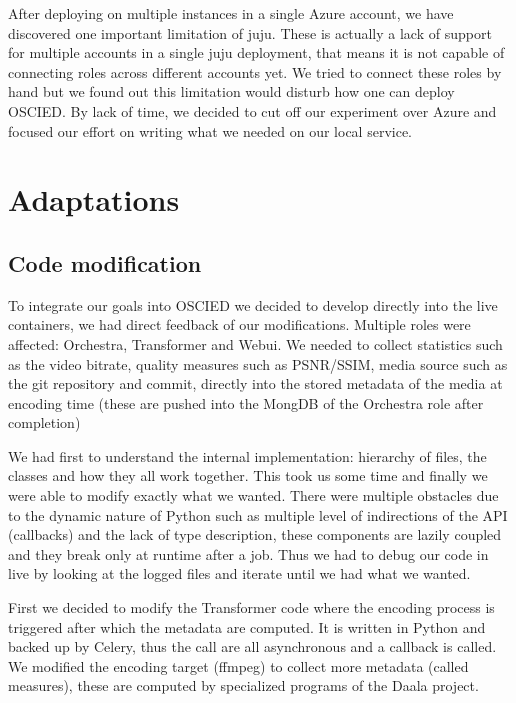 \documentclass[a4paper,12pt]{article}
\begin{document}
After deploying on multiple instances in a single Azure account, we have
discovered one important limitation of juju.  These is actually a lack of
support for multiple accounts in a single juju deployment, that means it is not
capable of connecting roles across different accounts yet.  We tried to connect
these roles by hand but we found out this limitation would disturb how one can
deploy OSCIED.  By lack of time, we decided to cut off our experiment over Azure
and focused our effort on writing what we needed on our local service.

\section{Adaptations}

\subsection{Code modification}
To integrate our goals into OSCIED we decided to develop directly into the live
containers, we had direct feedback of our modifications.  Multiple roles were
affected: Orchestra, Transformer and Webui.  We needed to collect statistics
such as the video bitrate, quality measures such as PSNR/SSIM, media source such
as the git repository and commit, directly into the stored metadata of the media
at encoding time (these are pushed into the MongDB of the Orchestra role after
completion)

We had first to understand the internal implementation: hierarchy of files, the
classes and how they all work together.  This took us some time and finally we
were able to modify exactly what we wanted.  There were multiple obstacles due
to the dynamic nature of Python such as multiple level of indirections of the
API (callbacks) and the lack of type description, these components are lazily
coupled and they break only at runtime after a job.  Thus we had to debug our
code in live by looking at the logged files and iterate until we had what we
wanted.

First we decided to modify the Transformer code where the encoding process is
triggered after which the metadata are computed.  It is written in Python and
backed up by Celery, thus the call are all asynchronous and a callback is
called.  We modified the encoding target (ffmpeg) to collect more metadata
(called measures), these are computed by specialized programs of the Daala
project.
\end{document}
